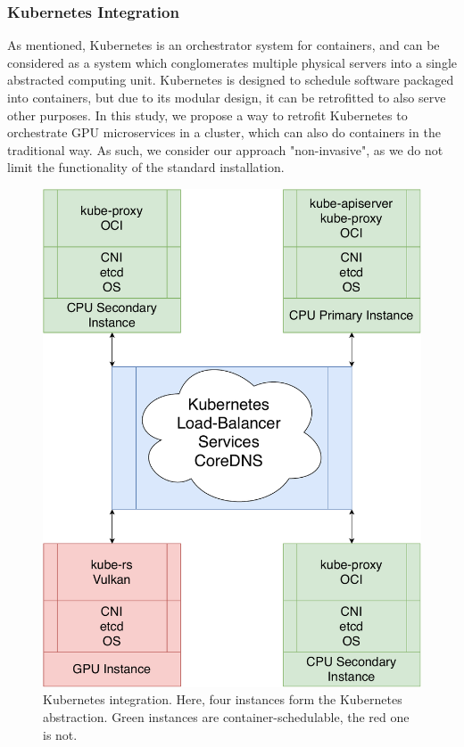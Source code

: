\documentclass{IEEEtran}
\begin{document}
\subsubsection{Kubernetes Integration}
\label{ch:k8s}

As mentioned, Kubernetes \cite{burns2016borg} is an orchestrator system for containers, and can be considered as a system which conglomerates multiple physical servers into a single abstracted computing unit. Kubernetes is designed to schedule software packaged into containers, but due to its modular design, it can be retrofitted to also serve other purposes. In this study, we propose a way to retrofit Kubernetes to orchestrate GPU microservices in a cluster, which can also do containers in the traditional way. As such, we consider our approach "non-invasive", as we do not limit the functionality of the standard installation.

\begin{figure}
  \centering
  \includegraphics[width=\columnwidth]{./assets/k8s2.pdf}
  \caption{Kubernetes integration. Here, four instances form the Kubernetes abstraction. Green instances are container-schedulable, the red one is not.}
  \label{fig:k8s}
\end{figure}
\end{document}
